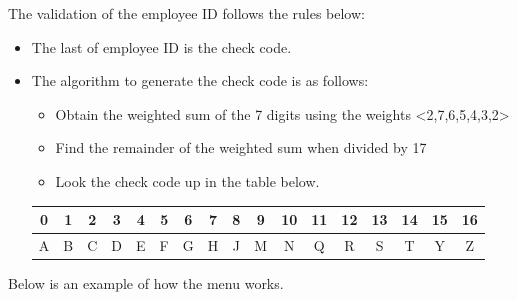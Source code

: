 The validation of the employee ID follows the rules below: 
\begin{itemize}
\item The last of employee ID is the check code. 
\item The algorithm to generate the check code is as follows:
\begin{itemize}
\item Obtain the weighted sum of the 7 digits using the weights <2,7,6,5,4,3,2> 
\item Find the remainder of the weighted sum when divided by 17 
\item Look the check code up in the table below. 
\end{itemize}
\noindent \begin{center}
\begin{tabular}{|c|c|c|c|c|c|c|c|c|c|c|c|c|c|c|c|c|}
\hline 
0 & 1 & 2 & 3 & 4 & 5 & 6 & 7 & 8 & 9 & 10 & 11 & 12 & 13 & 14 & 15 & 16\tabularnewline
\hline 
A & B & C & D & E & F & G & H & J & M & N & Q & R & S & T & Y & Z\tabularnewline
\hline 
\end{tabular}
\par\end{center}

\end{itemize}
Below is an example of how the menu works.

